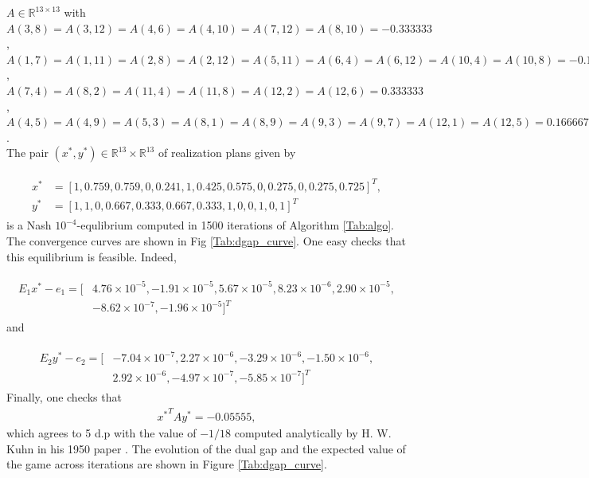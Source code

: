\documentclass{article} %
\begin{document}
 $A \in \mathbb{R}^{13 \times
  13}$ with $A(3,8) = A(3,12) = A(4,6) = A(4,10) = A(7,12) = A(8,10) =
{-0.333333}$, $A(1,7) = A(1,11) = A(2,8) = A(2,12) = A(5,11) =
A(6,4) = A(6,12) = A(10,4) = A(10,8) = {-0.166667}$, $A(7,4) =
A(8,2) = A(11,4) = A(11,8) = A(12,2) = A(12,6) = {0.333333}$,
$A(4,5) = A(4,9) = A(5,3) = A(8,1) = A(8,9) = A(9,3) = A(9,7) =
A(12,1) = A(12,5) = {0.166667}$.\\

The pair $(x^*, y^*) \in \mathbb{R}^{13} \times \mathbb{R}^{13}$ of
realization plans given by

\begin{eqnarray*}
  \begin{split}
    x^* &= [1, 0.759, 0.759, 0, 0.241, 1, 0.425, 0.575, 0, 0.275, 0,
      0.275, 0.725]^T,\\
    y^* &= [1, 1, 0, 0.667, 0.333, 0.667, 0.333, 1, 0, 0, 1, 0, 1]^T
    \end{split}
\end{eqnarray*}
is a Nash $10^{-4}$-equlibrium computed in 1500 iterations of
Algorithm  \ref{Tab:algo}. The convergence curves are shown
in Fig \ref{Tab:dgap_curve}. One easy checks that this equilibrium is
feasible. Indeed,

\begin{eqnarray*}
  \begin{split}
    E_1x^* - e_1 = [&4.76 \times 10^{-5}, -1.91 \times 10^{-5}, 5.67
      \times 10^{-5}, 8.23 \times 10^{-6}, 2.90 \times 10^{-5}, \\&
      -8.62 \times 10^{-7}, -1.96 \times 10^{-5}]^T
    \end{split}
\end{eqnarray*}
and

\begin{eqnarray*}
  \begin{split}
    E_2y^* - e_2 = [&-7.04 \times 10^{-7}, 2.27 \times 10^{-6}, -3.29
      \times 10^{-6}, -1.50 \times 10^{-6},\\
      &2.92 \times 10^{-6}, -4.97 \times 10^{-7}, -5.85 \times
      10^{-7}]^T
    \end{split}
\end{eqnarray*}
Finally, one checks that
\begin{eqnarray*}
  {x^*}^TAy^* = {-0.05555},
\end{eqnarray*}
 which agrees to 5 d.p with the value of $-1 / 18$ computed
 analytically by H. W. Kuhn in his 1950 paper \cite{kuhn}. The
 evolution of the dual gap and the expected value of the game across
 iterations are shown in Figure \ref{Tab:dgap_curve}.
\end{document}
